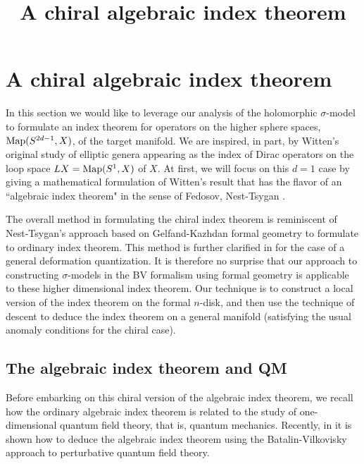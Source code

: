 \documentclass[10pt]{amsart}
\title{A chiral algebraic index theorem}
\begin{document}
\maketitle

\section{A chiral algebraic index theorem}

In this section we would like to leverage our analysis of the holomorphic $\sigma$-model to formulate an index theorem for operators on the higher sphere spaces, ${\rm Map}(S^{2d-1}, X)$, of the target manifold. 
We are inspired, in part, by Witten's original study of elliptic genera appearing as the index of Dirac operators on the loop space $LX = {\rm Map}(S^1, X)$ of $X$\cite{WittenDirac,WittenElliptic}.
At first, we will focus on this $d = 1$ case by giving a mathematical formulation of Witten's result that has the flavor of an ``algebraic index theorem" in the sense of Fedosov, Nest-Tsygan \cite{Fedosov, NestTsygan}. 

The overall method in formulating the chiral index theorem is reminiscent of Nest-Tsygan's approach based on Gelfand-Kazhdan formal geometry to formulate to ordinary index theorem.
This method is further clarified in \cite{FFS} for the case of a general deformation quantization. 
It is therefore no surprise that our approach to constructing $\sigma$-models in the BV formalism using formal geometry is applicable to these higher dimensional index theorem. 
Our technique is to construct a local version of the index theorem on the formal $n$-disk, and then use the technique of descent to deduce the index theorem on a general manifold (satisfying the usual anomaly conditions for the chiral case). 

\subsection{The algebraic index theorem and QM}

Before embarking on this chiral version of the algebraic index theorem, we recall how the ordinary algebraic index theorem is related to the study of one-dimensional quantum field theory, that is, quantum mechanics. 
Recently, in \cite{GLL} it is shown how to deduce the algebraic index theorem using the Batalin-Vilkovisky approach to perturbative quantum field theory. 
\end{document}
